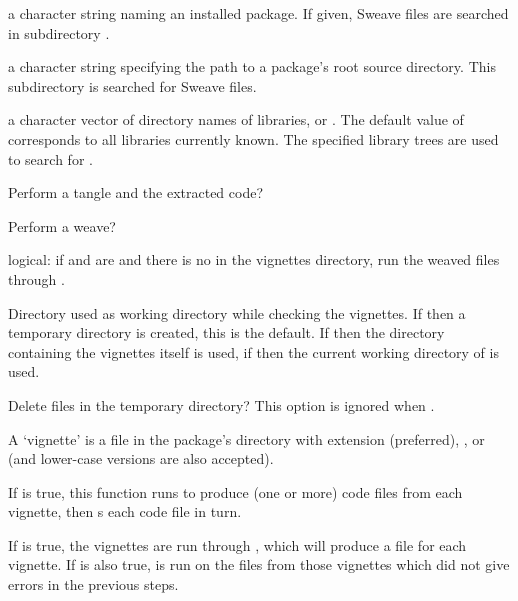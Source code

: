 %
\begin{Arguments}
\begin{ldescription}
\item[\code{package}] a character string naming an installed package.  If
given, Sweave files are searched in subdirectory .
\item[\code{dir}] a character string specifying the path to a package's root
source directory.  This subdirectory  is searched for
Sweave files.
\item[\code{lib.loc}] a character vector of directory names of \R{} libraries,
or .  The default value of  corresponds to all
libraries currently known.  The specified library trees are used to
search for .
\item[\code{tangle}] Perform a tangle and  the extracted code?
\item[\code{weave}] Perform a weave?
\item[\code{latex}] logical: if  and 
are  and there is no  in the vignettes
directory, run the weaved files through .
\item[\code{workdir}] Directory used as working directory while checking the
vignettes. If  then a temporary directory is created,
this is the default.  If  then the directory containing
the vignettes itself is used, if  then the current
working directory of \R{} is used.

\item[\code{keepfiles}] Delete files in the temporary directory?  This option is
ignored when .
\end{ldescription}
\end{Arguments}
%
\begin{Details}\relax
A `vignette' is a file in the package's  directory
with extension  (preferred), ,  or
 (and lower-case versions are also accepted).

If  is true, this function runs  to
produce (one or more) \R{} code files from each vignette, then
s each code file in turn.

If  is true, the vignettes are run through
, which will produce a  file for each
vignette.  If  is also true,  is run
on the  files from those vignettes which did not give
errors in the previous steps.
\end{Details}
